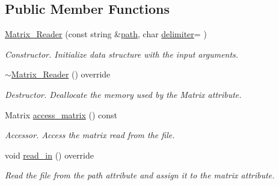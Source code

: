 \subsection*{Public Member Functions}
\begin{DoxyCompactItemize}
\item 
\mbox{\label{class_matrix___reader_aead34cd16f7ef3c2cbeffa390283d909}} 
\mbox{\hyperlink{class_matrix___reader_aead34cd16f7ef3c2cbeffa390283d909}{Matrix\+\_\+\+Reader}} (const string \&\mbox{\hyperlink{class_reader_a4f3eaccb117f248d4649ffb4e793a23d}{path}}, char \mbox{\hyperlink{class_data___reader_ac05700473d754089d7f30d2cc7dccce9}{delimiter}}=\textquotesingle{} \textquotesingle{})
\begin{DoxyCompactList}\small\item\em Constructor. Initialize data structure with the input arguments. \end{DoxyCompactList}\item 
\mbox{\label{class_matrix___reader_a576e866dc168437fd9272a0331b0a946}} 
\mbox{\hyperlink{class_matrix___reader_a576e866dc168437fd9272a0331b0a946}{$\sim$\+Matrix\+\_\+\+Reader}} () override
\begin{DoxyCompactList}\small\item\em Destructor. Deallocate the memory used by the Matrix attribute. \end{DoxyCompactList}\item 
\mbox{\label{class_matrix___reader_a4543c9a568c9a14e141c9f2606b6ae0d}} 
Matrix \mbox{\hyperlink{class_matrix___reader_a4543c9a568c9a14e141c9f2606b6ae0d}{access\+\_\+matrix}} () const
\begin{DoxyCompactList}\small\item\em Accessor. Access the matrix read from the file. \end{DoxyCompactList}\item 
\mbox{\label{class_matrix___reader_a2476159bd0e9985f7e5059410199e56a}} 
void \mbox{\hyperlink{class_matrix___reader_a2476159bd0e9985f7e5059410199e56a}{read\+\_\+in}} () override
\begin{DoxyCompactList}\small\item\em Read the file from the path attribute and assign it to the matrix attribute. \end{DoxyCompactList}\end{DoxyCompactItemize}
